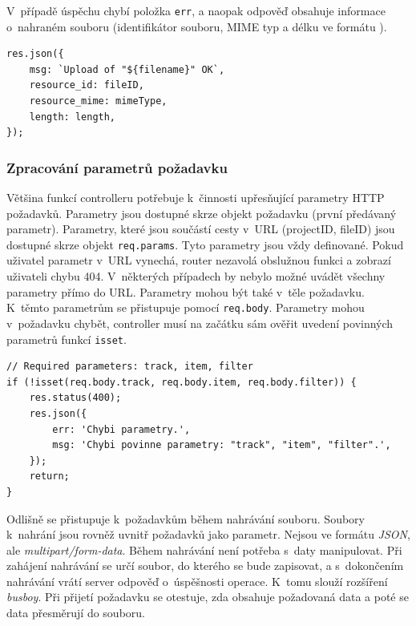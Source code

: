 V~případě úspěchu chybí položka \texttt{err}, a naopak odpověď obsahuje informace o~nahraném souboru (identifikátor souboru, MIME typ a délku ve formátu ).
\begin{lstlisting}[style=JavaScript]
res.json({
    msg: `Upload of "${filename}" OK`,
    resource_id: fileID,
    resource_mime: mimeType,
    length: length,
});
\end{lstlisting}

\subsubsection{Zpracování parametrů požadavku}
Většina funkcí controlleru potřebuje k~činnosti upřesňující parametry HTTP požadavků. Parametry jsou dostupné skrze objekt požadavku (první předávaný parametr). Parametry, které jsou součástí cesty v~URL (projectID, fileID) jsou dostupné skrze objekt \texttt{req.params}. Tyto parametry jsou vždy definované. Pokud uživatel parametr v~URL vynechá, router nezavolá obslužnou funkci a zobrazí uživateli chybu 404. V~některých případech by nebylo možné uvádět všechny parametry přímo do URL. Parametry mohou být také v~těle požadavku. K~těmto parametrům se přistupuje pomocí \texttt{req.body}. Parametry mohou v~požadavku chybět, controller musí na začátku sám ověřit uvedení povinných parametrů funkcí \texttt{isset}.
\begin{lstlisting}[style=JavaScript]
// Required parameters: track, item, filter
if (!isset(req.body.track, req.body.item, req.body.filter)) {
    res.status(400);
    res.json({
        err: 'Chybi parametry.',
        msg: 'Chybi povinne parametry: "track", "item", "filter".',
    });
    return;
}
\end{lstlisting}

Odlišně se přistupuje k~požadavkům během nahrávání souboru. Soubory k~nahrání jsou rovněž uvnitř požadavků jako parametr. Nejsou ve formátu \textit{JSON}, ale \textit{multipart/form-data}. Během nahrávání není potřeba s~daty manipulovat. Při zahájení nahrávání se určí soubor, do kterého se bude zapisovat, a s~dokončením nahrávání vrátí server odpověď o~úspěšnosti operace. K~tomu slouží rozšíření \textit{busboy}. Při přijetí požadavku se otestuje, zda obsahuje požadovaná data a poté se data přesměrují do souboru.

